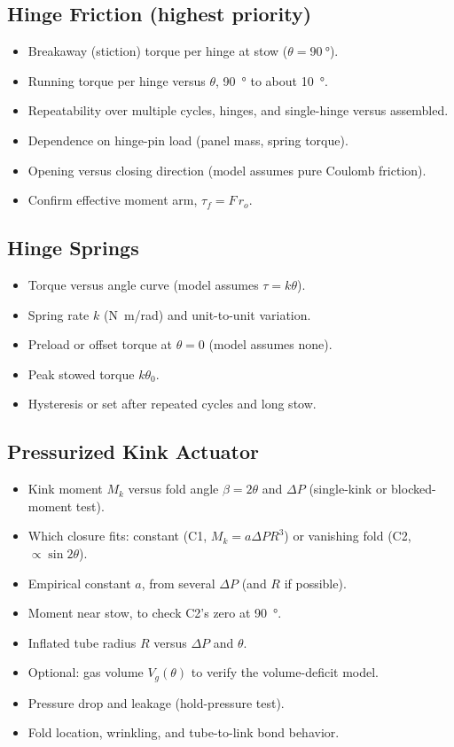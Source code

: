 \documentclass[11pt]{article}
\begin{document}
\subsection{Hinge Friction (highest priority)}
\label{sec:friction}
\begin{itemize}[noitemsep]
    \item Breakaway (stiction) torque per hinge at stow ($\theta=\SI{90}{\degree}$).
    \item Running torque per hinge versus $\theta$, \SI{90}{\degree} to about \SI{10}{\degree}.
    \item Repeatability over multiple cycles, hinges, and single-hinge versus assembled.
    \item Dependence on hinge-pin load (panel mass, spring torque).
    \item Opening versus closing direction (model assumes pure Coulomb friction).
    \item Confirm effective moment arm, $\tau_f = F\,r_o$.
\end{itemize}

\subsection{Hinge Springs}
\label{sec:spring}
\begin{itemize}[noitemsep]
    \item Torque versus angle curve (model assumes $\tau=k\theta$).
    \item Spring rate $k$ (\si{N.m/rad}) and unit-to-unit variation.
    \item Preload or offset torque at $\theta=0$ (model assumes none).
    \item Peak stowed torque $k\theta_0$.
    \item Hysteresis or set after repeated cycles and long stow.
\end{itemize}

\subsection{Pressurized Kink Actuator}
\label{sec:kink}
\begin{itemize}[noitemsep]
    \item Kink moment $M_k$ versus fold angle $\beta=2\theta$ and $\Delta P$ (single-kink or blocked-moment test).
    \item Which closure fits: constant (C1, $M_k=a\Delta P R^3$) or vanishing fold (C2, $\propto\sin2\theta$).
    \item Empirical constant $a$, from several $\Delta P$ (and $R$ if possible).
    \item Moment near stow, to check C2's zero at \SI{90}{\degree}.
    \item Inflated tube radius $R$ versus $\Delta P$ and $\theta$.
    \item Optional: gas volume $V_g(\theta)$ to verify the volume-deficit model.
    \item Pressure drop and leakage (hold-pressure test).
    \item Fold location, wrinkling, and tube-to-link bond behavior.
\end{itemize}
\end{document}
